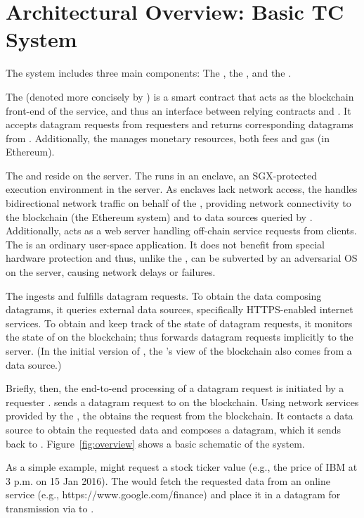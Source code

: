 \section{Architectural Overview: Basic TC System}

The \tcs system includes three main components: The \tcontract, the \encname, and the \medname.

The \tcontract (denoted more concisely by \tcont) is a smart contract that acts as the blockchain front-end of the \tc service, and thus an interface between relying contracts and \tc. It accepts datagram requests from requesters and returns corresponding datagrams from \tc. Additionally, the \tcontract manages \tc monetary resources, both fees and gas (in Ethereum). 

The \encname and \medname reside on the \tc server. The \encname runs in an enclave, an SGX-protected execution environment in the server. As enclaves lack network access, the \medname handles bidirectional network traffic on behalf of the \encname, providing network connectivity to the blockchain (the Ethereum system) and to data sources queried by \encname. Additionally, \medname acts as a web server handling off-chain service requests from clients. The \medname is an ordinary user-space application. It does not benefit from special hardware protection and thus, unlike the \encname, can be subverted by an adversarial OS on the \tc server, causing network delays or failures.

The \encname ingests and fulfills datagram requests. To obtain the data composing datagrams, it queries external data sources, specifically HTTPS-enabled internet services. To obtain and keep track of the state of datagram requests, it monitors the state of \tcontract on the blockchain; thus \tcontract forwards datagram requests implicitly to the \tc server. (In the initial version of \tcontract, the \encname's view of the blockchain also comes from a data source.) 

Briefly, then, the end-to-end processing of a datagram request is initiated by a requester \reqcont. \reqcont sends a datagram request to \tcont on the blockchain. Using network services provided by the \medname, the \encname obtains the request from the blockchain. It contacts a data source to obtain the requested data and composes a datagram, which it sends back to \reqcont. Figure~\ref{fig:overview} shows a basic schematic of the \tc system.

As a simple example, \reqcont might request a stock ticker value (e.g., the price of IBM at 3 p.m. on 15 Jan 2016). The \encname would fetch the requested data from an online service (e.g., https://www.google.com/finance) and place it in a datagram for transmission via \tcont to \reqcont.

